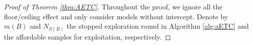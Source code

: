 \documentclass[a4paper,11pt]{article}
\numberwithin{equation}{section}
\theoremstyle{plain}
\theoremstyle{definition}
\newtheorem{Rem}[Th]{Remark}
\def\N{{\mathbb N}}
\begin{document}


 
\begin{proof}[Proof of Theorem \ref{thm:AETC}]
Throughout the proof, we ignore all the floor/ceiling effect and only consider models without intercept. 
Denote by $m(B)$ and $N_{S(B)}$ the stopped exploration round in Algorithm \ref{alg:aETC} and the affordable samples for exploitation, respectively. 


\end{proof}
\end{document}
